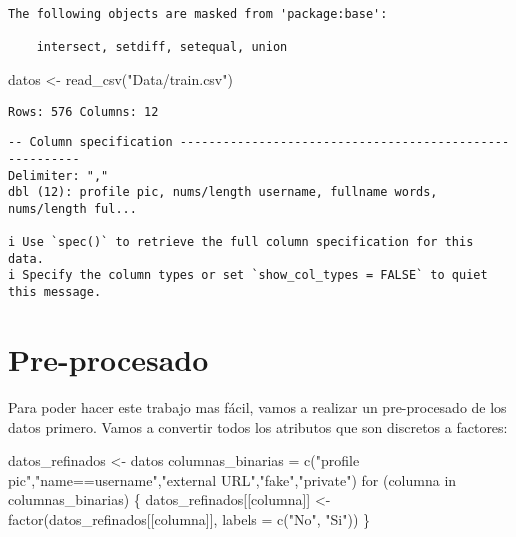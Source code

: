 \documentclass[
  letterpaper,
  DIV=11,
  numbers=noendperiod]{scrreprt}
\newenvironment{Shaded}{\begin{snugshade}}{\end{snugshade}}
\newcommand{\AttributeTok}[1]{\textcolor[rgb]{0.40,0.45,0.13}{#1}}
\newcommand{\ControlFlowTok}[1]{\textcolor[rgb]{0.00,0.23,0.31}{#1}}
\newcommand{\FunctionTok}[1]{\textcolor[rgb]{0.28,0.35,0.67}{#1}}
\newcommand{\NormalTok}[1]{\textcolor[rgb]{0.00,0.23,0.31}{#1}}
\newcommand{\OtherTok}[1]{\textcolor[rgb]{0.00,0.23,0.31}{#1}}
\newcommand{\StringTok}[1]{\textcolor[rgb]{0.13,0.47,0.30}{#1}}
\begin{document}
\begin{verbatim}
The following objects are masked from 'package:base':

    intersect, setdiff, setequal, union
\end{verbatim}

\begin{Shaded}
\begin{Highlighting}[]
\NormalTok{datos }\OtherTok{\textless{}{-}} \FunctionTok{read\_csv}\NormalTok{(}\StringTok{"Data/train.csv"}\NormalTok{) }
\end{Highlighting}
\end{Shaded}

\begin{verbatim}
Rows: 576 Columns: 12
\end{verbatim}

\begin{verbatim}
-- Column specification --------------------------------------------------------
Delimiter: ","
dbl (12): profile pic, nums/length username, fullname words, nums/length ful...

i Use `spec()` to retrieve the full column specification for this data.
i Specify the column types or set `show_col_types = FALSE` to quiet this message.
\end{verbatim}

\section{Pre-procesado}\label{pre-procesado}

Para poder hacer este trabajo mas fácil, vamos a realizar un
pre-procesado de los datos primero. Vamos a convertir todos los
atributos que son discretos a factores:

\begin{Shaded}
\begin{Highlighting}[]
\NormalTok{datos\_refinados }\OtherTok{\textless{}{-}}\NormalTok{ datos}
\NormalTok{columnas\_binarias }\OtherTok{=} \FunctionTok{c}\NormalTok{(}\StringTok{"profile pic"}\NormalTok{,}\StringTok{"name==username"}\NormalTok{,}\StringTok{"external URL"}\NormalTok{,}\StringTok{"fake"}\NormalTok{,}\StringTok{"private"}\NormalTok{)}
\ControlFlowTok{for}\NormalTok{ (columna }\ControlFlowTok{in}\NormalTok{ columnas\_binarias) \{}
\NormalTok{  datos\_refinados[[columna]] }\OtherTok{\textless{}{-}}  \FunctionTok{factor}\NormalTok{(datos\_refinados[[columna]], }\AttributeTok{labels =} \FunctionTok{c}\NormalTok{(}\StringTok{"No"}\NormalTok{, }\StringTok{"Si"}\NormalTok{))}
\NormalTok{\}}
\end{Highlighting}
\end{Shaded}
\end{document}
